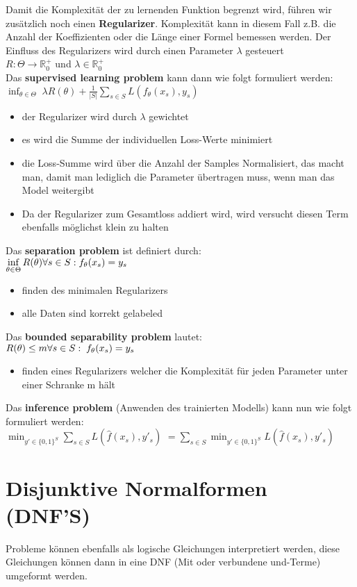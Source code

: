 \documentclass[12pt,a4paper]{article}
\newcommand{\nl}{\\[0.1cm]}
\begin{document}
Damit die Komplexität der zu lernenden Funktion begrenzt wird, führen wir zusätzlich noch einen \textbf{Regularizer}. Komplexität kann in diesem Fall z.B. die Anzahl der Koeffizienten oder die Länge einer Formel bemessen werden. Der Einfluss des Regularizers wird durch einen Parameter $\lambda$ gesteuert\nl
$R: \Theta \rightarrow \mathbb{R}_0^+$ und $\lambda\in\mathbb{R}_0^+$\nl
Das \textbf{supervised learning problem} kann dann wie folgt formuliert werden:\nl
$\displaystyle \inf_{\theta\in\Theta} \; \lambda R(\theta) + \frac{1}{|S|} \sum_{s\in S} L(f_\theta (x_s), y_s)$
\begin{itemize}
\item der Regularizer wird durch $\lambda$ gewichtet
\item es wird die Summe der individuellen Loss-Werte minimiert
\item die Loss-Summe wird über die Anzahl der Samples Normalisiert, das macht man, damit man lediglich die Parameter übertragen muss, wenn man das Model weitergibt
\item Da der Regularizer zum Gesamtloss addiert wird, wird versucht diesen Term ebenfalls möglichst klein zu halten
\end{itemize}
Das \textbf{separation problem} ist definiert durch:\nl
$\displaystyle \inf_{\theta \in \Theta} R(\theta) \\ \forall s\in S: f_\theta(x_s) = y_s$
\begin{itemize}
\item finden des minimalen Regularizers
\item alle Daten sind korrekt gelabeled
\end{itemize}
Das \textbf{bounded separability problem} lautet:\nl
$R(\theta) \leq m \\ \forall s\in S: \; f_\theta(x_s) = y_s$
\begin{itemize}
\item finden eines Regularizers welcher die Komplexität für jeden Parameter unter einer Schranke m hält
\end{itemize}
Das \textbf{inference problem} (Anwenden des trainierten Modells) kann nun wie folgt formuliert werden:\nl
$\displaystyle \min_{y'\in \{0,1\}^S}\sum_{s\in S}L(\hat{f}(x_s),y'_s)$
$\displaystyle = \sum_{s\in S} \min_{y'\in \{0, 1\}^S} L(\hat{f}(x_s),y'_s)$

\section{Disjunktive Normalformen (DNF'S)}
Probleme können ebenfalls als logische Gleichungen interpretiert werden, diese Gleichungen können dann in eine DNF (Mit oder verbundene und-Terme) umgeformt werden.
\end{document}
